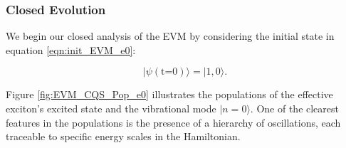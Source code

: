 \documentclass[11pt]{article}
\newcounter{subsubsubsection}[subsubsection]
\begin{document}
\subsubsection{Closed Evolution}


We begin our closed analysis of the EVM by considering the initial state in equation \eqref{eqn:init_EVM_e0}:

\begin{equation*}
    |\psi (\text{t=0})\rangle = |1, 0\rangle.
\end{equation*}


\noindent Figure \ref{fig:EVM_CQS_Pop_e0} illustrates the populations of the effective exciton's excited state and the vibrational mode $|n=0\rangle$. One of the clearest features in the populations is the presence of a hierarchy of oscillations, each traceable to specific energy scales in the Hamiltonian. 
\end{document}
